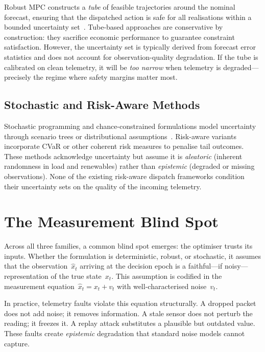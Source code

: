 Robust MPC constructs a \emph{tube} of feasible trajectories around the
nominal forecast, ensuring that the dispatched action is safe for all
realisations within a bounded uncertainty set~\cite{bemporad2007robust}.
Tube-based approaches are conservative by construction: they sacrifice
economic performance to guarantee constraint satisfaction.  However, the
uncertainty set is typically derived from forecast error statistics and
does not account for observation-quality degradation.  If the tube is
calibrated on clean telemetry, it will be \emph{too narrow} when telemetry
is degraded---precisely the regime where safety margins matter most.

\subsection{Stochastic and Risk-Aware Methods}

Stochastic programming and chance-constrained formulations model
uncertainty through scenario trees or distributional
assumptions~\cite{shapiro2021lectures}.  Risk-aware variants incorporate
CVaR or other coherent risk measures to penalise tail outcomes.  These
methods acknowledge uncertainty but assume it is \emph{aleatoric}
(inherent randomness in load and renewables) rather than \emph{epistemic}
(degraded or missing observations).  None of the existing risk-aware
dispatch frameworks condition their uncertainty sets on the quality of the
incoming telemetry.

\section{The Measurement Blind Spot}

Across all three families, a common blind spot emerges: the optimiser
trusts its inputs.  Whether the formulation is deterministic, robust, or
stochastic, it assumes that the observation~$\hat{x}_t$ arriving at the
decision epoch is a faithful---if noisy---representation of the true
state~$x_t$.  This assumption is codified in the measurement
equation~$\hat{x}_t = x_t + v_t$ with well-characterised noise~$v_t$.

In practice, telemetry faults violate this equation structurally.  A
dropped packet does not add noise; it removes information.  A stale
sensor does not perturb the reading; it freezes it.  A replay attack
substitutes a plausible but outdated value.  These faults create
\emph{epistemic} degradation that standard noise models cannot capture.

